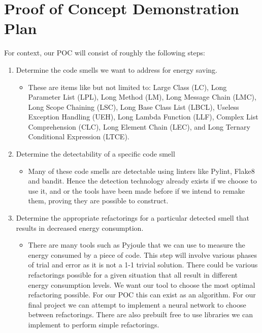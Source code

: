 \documentclass{article}
\begin{document}

\section{Proof of Concept Demonstration Plan}

For context, our POC will consist of roughly the following steps:
\begin{enumerate}
  \item Determine the code smells we want to address for energy saving.
  \begin{itemize}
    \item These are items like but not limited to: Large Class (LC), Long Parameter List (LPL), Long Method (LM), Long Message Chain (LMC), Long Scope Chaining (LSC), Long Base Class List (LBCL), Useless Exception Handling (UEH), Long Lambda Function (LLF), Complex List Comprehension (CLC), Long Element Chain (LEC), and Long Ternary Conditional Expression (LTCE).     
  \end{itemize} 
  \item Determine the detectability of a specific code smell 
  \begin{itemize}
    \item Many of these code smells are detectable using linters like Pylint, Flake8 and bandit. Hence the detection technology already exists if we choose to use it, and or the tools have been made before if we intend to remake them, proving they are possible to construct.
  \end{itemize} 
  \item Determine the appropriate refactorings for a particular detected smell that results in decreased energy consumption.
  \begin{itemize}
    \item There are many tools such as Pyjoule that we can use to measure the energy consumed by a piece of code. This step will involve various phases of trial and error as it is not a 1-1 trivial solution. There could be various refactorings possible for a given situation that all result in different energy consumption levels. We want our tool to choose the most optimal refactoring possible. For our POC this can exist as an algorithm. For our final project we can attempt to implement a neural network to choose between refactorings. There are also prebuilt free to use libraries we can implement to perform simple refactorings.

\end{itemize}
\end{enumerate}
\end{document}
